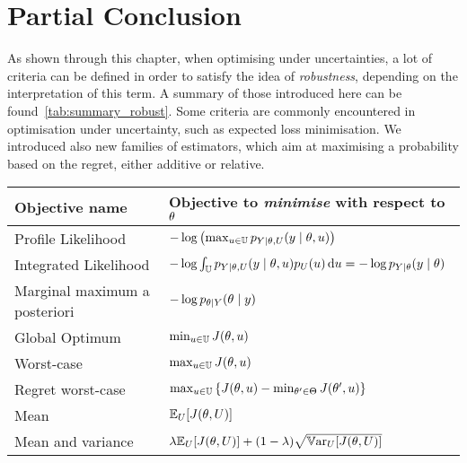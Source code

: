 \documentclass[../../Main_ManuscritThese.tex]{subfiles}
\begin{document}
\section{Partial Conclusion}
\label{sec:ch3_partial_ccl}
As shown through this chapter, when optimising under uncertainties, a
lot of criteria can be defined in order to satisfy the idea of
\emph{robustness}, depending on the interpretation of this term. A
summary of those introduced here can be
found~\cref{tab:summary_robust}. Some criteria are commonly
encountered in optimisation under uncertainty, such as expected loss
minimisation. We introduced also new families of estimators, which aim
at maximising a probability based on the regret, either additive or
relative.
\begin{table}[ht]
  \centering
  \begin{tabular}{ll}
    \toprule
    Objective name                & Objective to \emph{minimise} with respect to  $\theta$                                                                                 \\ \midrule
    Profile Likelihood            & $-\log \left(\max_{u \in \mathbb{U}} p_{Y \mid \theta, U}(y \mid \theta, u)\right)$                                       \\
    Integrated Likelihood         & $-\log \int_{\mathbb{U}} p_{Y \mid \theta, U}(y \mid \theta, u)p_{U}(u) \,\mathrm{d}u=-\log p_{Y\mid \theta}(y\mid \theta)$ \\
    Marginal maximum a posteriori & $-\log p_{\theta\mid Y}(\theta \mid y)$                                                                                      \\ \midrule
    Global Optimum                & $\min_{u\in\mathbb{U}} J(\theta, u)$                                                                                     \\
    Worst-case                    & $\max_{u \in \mathbb{U}} J(\theta, u)$                                                                                   \\
    Regret worst-case             & $\max_{u\in\mathbb{U}}\left\{J(\theta, u) - \min_{\theta^{\prime}\in\Theta} J(\theta^{\prime}, u)\right\}$                  \\ \midrule
    Mean                          & $\mathbb{E}_{U}[J(\theta, U)]$                                                                                               \\
    Mean and variance             & $ \lambda \mathbb{E}_{U}[J(\theta, U)] + (1-\lambda) \sqrt{\mathbb{V}\mathrm{ar}_{U}[J(\theta, U)]}$                                         \\ \midrule

\end{tabular}
\end{table}
\end{document}
